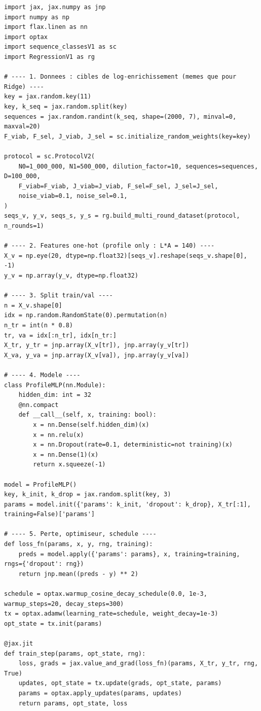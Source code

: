 \documentclass[11pt,a4paper]{article}
\begin{document}
\begin{lstlisting}
import jax, jax.numpy as jnp
import numpy as np
import flax.linen as nn
import optax
import sequence_classesV1 as sc
import RegressionV1 as rg

# ---- 1. Donnees : cibles de log-enrichissement (memes que pour Ridge) ----
key = jax.random.key(11)
key, k_seq = jax.random.split(key)
sequences = jax.random.randint(k_seq, shape=(2000, 7), minval=0, maxval=20)
F_viab, F_sel, J_viab, J_sel = sc.initialize_random_weights(key=key)

protocol = sc.ProtocolV2(
    N0=1_000_000, N1=500_000, dilution_factor=10, sequences=sequences, D=100_000,
    F_viab=F_viab, J_viab=J_viab, F_sel=F_sel, J_sel=J_sel,
    noise_viab=0.1, noise_sel=0.1,
)
seqs_v, y_v, seqs_s, y_s = rg.build_multi_round_dataset(protocol, n_rounds=1)

# ---- 2. Features one-hot (profile only : L*A = 140) ----
X_v = np.eye(20, dtype=np.float32)[seqs_v].reshape(seqs_v.shape[0], -1)
y_v = np.array(y_v, dtype=np.float32)

# ---- 3. Split train/val ----
n = X_v.shape[0]
idx = np.random.RandomState(0).permutation(n)
n_tr = int(n * 0.8)
tr, va = idx[:n_tr], idx[n_tr:]
X_tr, y_tr = jnp.array(X_v[tr]), jnp.array(y_v[tr])
X_va, y_va = jnp.array(X_v[va]), jnp.array(y_v[va])

# ---- 4. Modele ----
class ProfileMLP(nn.Module):
    hidden_dim: int = 32
    @nn.compact
    def __call__(self, x, training: bool):
        x = nn.Dense(self.hidden_dim)(x)
        x = nn.relu(x)
        x = nn.Dropout(rate=0.1, deterministic=not training)(x)
        x = nn.Dense(1)(x)
        return x.squeeze(-1)

model = ProfileMLP()
key, k_init, k_drop = jax.random.split(key, 3)
params = model.init({'params': k_init, 'dropout': k_drop}, X_tr[:1], training=False)['params']

# ---- 5. Perte, optimiseur, schedule ----
def loss_fn(params, x, y, rng, training):
    preds = model.apply({'params': params}, x, training=training, rngs={'dropout': rng})
    return jnp.mean((preds - y) ** 2)

schedule = optax.warmup_cosine_decay_schedule(0.0, 1e-3, warmup_steps=20, decay_steps=300)
tx = optax.adamw(learning_rate=schedule, weight_decay=1e-3)
opt_state = tx.init(params)

@jax.jit
def train_step(params, opt_state, rng):
    loss, grads = jax.value_and_grad(loss_fn)(params, X_tr, y_tr, rng, True)
    updates, opt_state = tx.update(grads, opt_state, params)
    params = optax.apply_updates(params, updates)
    return params, opt_state, loss


\end{lstlisting}
\end{document}
